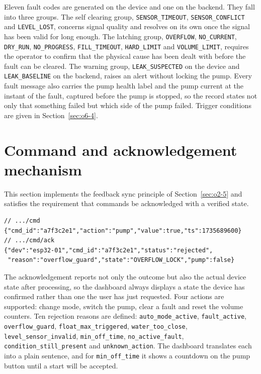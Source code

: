 Eleven fault codes are generated on the device and one on the backend. They fall into three groups. The self clearing group, \texttt{SENSOR\_TIMEOUT}, \texttt{SENSOR\_CONFLICT} and \texttt{LEVEL\_LOST}, concerns signal quality and resolves on its own once the signal has been valid for long enough. The latching group, \texttt{OVERFLOW}, \texttt{NO\_CURRENT}, \texttt{DRY\_RUN}, \texttt{NO\_PROGRESS}, \texttt{FILL\_TIMEOUT}, \texttt{HARD\_LIMIT} and \texttt{VOLUME\_LIMIT}, requires the operator to confirm that the physical cause has been dealt with before the fault can be cleared. The warning group, \texttt{LEAK\_SUSPECTED} on the device and \texttt{LEAK\_BASELINE} on the backend, raises an alert without locking the pump. Every fault message also carries the pump health label and the pump current at the instant of the fault, captured before the pump is stopped, so the record states not only that something failed but which side of the pump failed. Trigger conditions are given in Section~\ref{sec:o6-4}.

\section{Command and acknowledgement mechanism}
\label{sec:o4-3}

This section implements the feedback sync principle of Section~\ref{sec:o2-5} and satisfies the requirement that commands be acknowledged with a verified state.

\begin{lstlisting}[caption={Command message and matching acknowledgement.},label={lst:cmd}]
// .../cmd
{"cmd_id":"a7f3c2e1","action":"pump","value":true,"ts":1735689600}
// .../cmd/ack
{"dev":"esp32-01","cmd_id":"a7f3c2e1","status":"rejected",
 "reason":"overflow_guard","state":"OVERFLOW_LOCK","pump":false}
\end{lstlisting}

The acknowledgement reports not only the outcome but also the actual device state after processing, so the dashboard always displays a state the device has confirmed rather than one the user has just requested. Four actions are supported: change mode, switch the pump, clear a fault and reset the volume counters. Ten rejection reasons are defined: \texttt{auto\_mode\_active}, \texttt{fault\_active}, \texttt{overflow\_guard}, \texttt{float\_max\_triggered}, \texttt{water\_too\_close}, \texttt{level\_sensor\_invalid}, \texttt{min\_off\_time}, \texttt{no\_active\_fault}, \texttt{condition\_still\_present} and \texttt{unknown\_action}. The dashboard translates each into a plain sentence, and for \texttt{min\_off\_time} it shows a countdown on the pump button until a start will be accepted.

